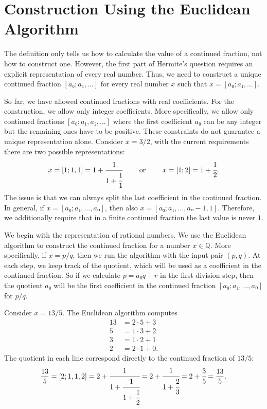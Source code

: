 \section{Construction Using the Euclidean Algorithm}
\label{sec:cf-construction}

The definition only tells us how to calculate the value of a continued fraction,
not how to construct one.
However, the first part of Hermite's question requires an explicit representation of every real number.
Thus, we need to construct a unique continued fraction $[a₀; a₁, …]$ for every
real number $x$ such that $x = [a₀; a₁, …]$.

So far, we have allowed continued fractions with real coefficients.
For the construction, we allow only integer coefficients.
More specifically, we allow only continued fractions $[a₀; a₁, a₂, …]$
where the first coefficient $a₀$ can be any integer but the remaining ones have to be positive.
These constraints do not guarantee a unique representation alone.
Consider $x = 3/2$, with the current requirements there are two possible representations:
\[
  x = [1; 1, 1] = 1 + \cfrac{1}{1 + \cfrac{1}{1}} \qquad \text{ or } \qquad x = [1; 2] = 1 + \cfrac{1}{2}.
\]
The issue is that we can always split the last coefficient in the continued fraction.
In general, if $x = [a₀; a₁, …, aₙ]$, then also $x = [a₀; a₁, …, aₙ - 1, 1]$.
Therefore, we additionally require that in a finite continued fraction the last value is never $1$.

We begin with the representation of rational numbers.
We use the Euclidean algorithm to construct the continued fraction for a number $x ∈ ℚ$.
More specifically, if $x = p/q$, then we run the algorithm with the input pair $(p, q)$.
At each step, we keep track of the quotient,
which will be used as a coefficient in the continued fraction.
So if we calculate $p = a₀q + r$ in the first division step, then the quotient $a₀$ will be
the first coefficient in the continued fraction $[a₀; a₁, …, aₙ]$ for $p/q$.

\begin{example}
  \label{ex:euclidean-cf}
  Consider $x = 13/5$.
  The Euclidean algorithm computes
  \begin{align*}
    13 & = 2 · 5 + 3 \\
     5 & = 1 · 3 + 2 \\
     3 & = 1 · 2 + 1 \\
     2 & = 2 · 1 + 0.
  \end{align*}
  The quotient in each line correspond directly to the continued fraction of $13/5$:
  \[
    \frac{13}{5}
    = [2; 1, 1, 2]
    = 2 + \cfrac{1}{1 + \cfrac{1}{1 + \cfrac{1}{2}}}
    = 2 + \cfrac{1}{1 + \cfrac{2}{3}}
    = 2 + \cfrac{3}{5}
    = \frac{13}{5}.
  \]
\end{example}

